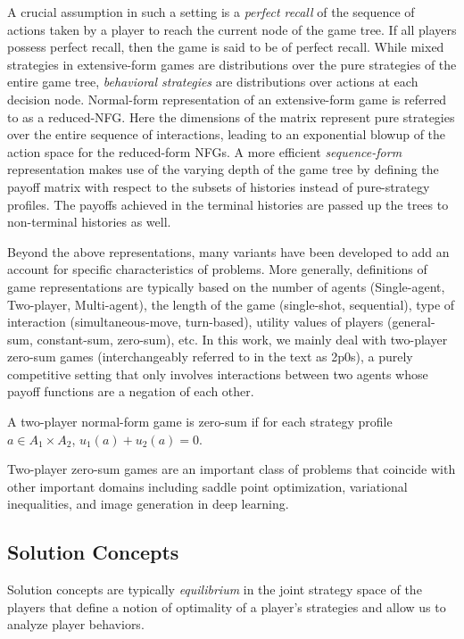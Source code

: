 A crucial assumption in such a setting is a \textit{perfect recall} of the sequence of actions taken
by a player to reach the current node of the game tree.
If all players possess perfect recall, then the game is said to be of perfect recall.
While mixed strategies in extensive-form games are distributions over the pure strategies of the
entire game tree, \textit{behavioral strategies} are distributions over actions at each decision
node.
Normal-form representation of an extensive-form game is referred to as a reduced-NFG.
Here the dimensions of the matrix represent pure strategies over the entire sequence of
interactions, leading to an exponential blowup of the action space for the reduced-form NFGs.
A more efficient \textit{sequence-form} representation makes use of the varying depth of the game
tree by defining the payoff matrix with respect to the subsets of histories instead of
pure-strategy profiles.
The payoffs achieved in the terminal histories are passed up the trees to non-terminal histories as
well.

Beyond the above representations, many variants have been developed to add an account for specific
characteristics of problems.
More generally, definitions of game representations are typically based on the number of agents
(Single-agent, Two-player, Multi-agent), the length of the game (single-shot, sequential), type of
interaction (simultaneous-move, turn-based), utility values of players (general-sum, constant-sum,
zero-sum), etc. In this work, we mainly deal with two-player zero-sum games (interchangeably referred
to in the text as 2p0s), a purely competitive setting that only involves interactions between two
agents whose payoff functions are a negation of each other.
\begin{definition}
	A two-player normal-form game is zero-sum if for each strategy profile $a \in A_1 \times A_2$,
	$u_1(a) + u_2(a) = 0$.
\end{definition}
Two-player zero-sum games are an important class of problems that coincide with other important
domains including saddle point optimization, variational inequalities, and image generation in deep
learning.

\subsection{Solution Concepts}
Solution concepts are typically \textit{equilibrium} in the joint strategy space of the players
that define a notion of optimality of a player's strategies and allow us to analyze player
behaviors.

